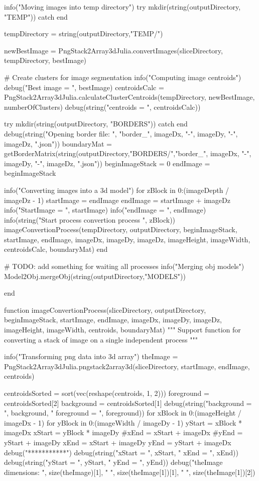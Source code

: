 \documentclass[11pt,oneside]{article}	%
\begin{document}
{  info("Moving images into temp directory")
  try
    mkdir(string(outputDirectory, "TEMP"))
  catch
  end

  tempDirectory = string(outputDirectory,"TEMP/")

  newBestImage = PngStack2Array3dJulia.convertImages(sliceDirectory, tempDirectory, bestImage)

  # Create clusters for image segmentation
  info("Computing image centroids")
  debug("Best image = ", bestImage)
  centroidsCalc = PngStack2Array3dJulia.calculateClusterCentroids(tempDirectory, newBestImage, numberOfClusters)
  debug(string("centroids = ", centroidsCalc))

  try
    mkdir(string(outputDirectory, "BORDERS"))
  catch
  end
  debug(string("Opening border file: ", "border_", imageDx, "-", imageDy, "-", imageDz, ".json"))
  boundaryMat = getBorderMatrix(string(outputDirectory,"BORDERS/","border_", imageDx, "-",
                                       imageDy, "-", imageDz, ".json"))
  beginImageStack = 0
  endImage = beginImageStack

  info("Converting images into a 3d model")
  for zBlock in 0:(imageDepth / imageDz - 1)
    startImage = endImage
    endImage = startImage + imageDz
    info("StartImage = ", startImage)
    info("endImage = ", endImage)
    info(string("Start process convertion process ", zBlock))
    imageConvertionProcess(tempDirectory, outputDirectory,
                           beginImageStack, startImage, endImage,
                           imageDx, imageDy, imageDz,
                           imageHeight, imageWidth,
                           centroidsCalc, boundaryMat)
  end

  # TODO: add something for waiting all processes
  info("Merging obj models")
  Model2Obj.mergeObj(string(outputDirectory,"MODELS"))

end

function imageConvertionProcess(sliceDirectory, outputDirectory,
                                beginImageStack, startImage, endImage,
                                imageDx, imageDy, imageDz,
                                imageHeight, imageWidth,
                                centroids, boundaryMat)
  """
  Support function for converting a stack of image on a single
  independent process
  """

  info("Transforming png data into 3d array")
  theImage = PngStack2Array3dJulia.pngstack2array3d(sliceDirectory, startImage, endImage, centroids)

  centroidsSorted = sort(vec(reshape(centroids, 1, 2)))
  foreground = centroidsSorted[2]
  background = centroidsSorted[1]
  debug(string("background = ", background, " foreground = ", foreground))
  for xBlock in 0:(imageHeight / imageDx - 1)
    for yBlock in 0:(imageWidth / imageDy - 1)
      yStart = xBlock * imageDx
      xStart = yBlock * imageDy
      #xEnd = xStart + imageDx
      #yEnd = yStart + imageDy
      xEnd = xStart + imageDy
      yEnd = yStart + imageDx
      debug("***********")
      debug(string("xStart = ", xStart, " xEnd = ", xEnd))
      debug(string("yStart = ", yStart, " yEnd = ", yEnd))
      debug("theImage dimensions: ", size(theImage)[1], " ", size(theImage[1])[1], " ", size(theImage[1])[2])

}
\end{document}
